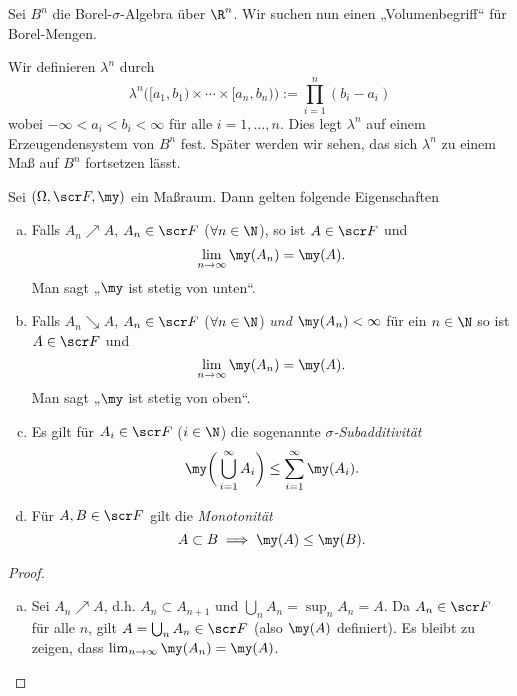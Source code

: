 \begin{ex} \label{1.1.9}
	Sei $B^n$ die Borel-$\sigma$-Algebra über $\R^n$.
	Wir suchen nun einen „Volumenbegriff“ für Borel-Mengen.

	Wir definieren $\lambda^n$ durch
	\[
		\lambda^n \Big( [a_1,b_1) \times \dotsb \times [a_n,b_n) \Big)
		:= \prod_{i=1}^n (b_i-a_i)
	\]
	wobei $-\infty < a_i < b_i < \infty$ für alle $i = 1, \dotsc, n$.
	Dies legt $\lambda^n$ auf einem Erzeugendensystem von $B^n$ fest.
	Später werden wir sehen, das sich $\lambda^n$ zu einem Maß auf $B^n$ fortsetzen lässt.
\end{ex}

\begin{lem} \label{1.1.10}
	Sei $(\Omega, \scr F, \my)$ ein Maßraum.
	Dann gelten folgende Eigenschaften
	\begin{enumerate}[(a)]
		\item
			Falls $A_n \nearrow A$, $A_n \in \scr F$ ($\forall n\in \N$), so ist $A \in \scr F$ und
			\[
				\lim_{n\to \infty} \my (A_n) = \my(A).
			\]
			Man sagt „$\my$ ist stetig von unten“.
		\item
			Falls $A_n \searrow A$, $A_n \in \scr F$ ($\forall n\in \N$) \emph{und} $\my(A_n) < \infty$ für ein $n \in \N$ so ist $A \in \scr F$ und
			\[
				\lim_{n\to \infty} \my(A_n) = \my(A).
			\]
			Man sagt „$\my$ ist stetig von oben“.
		\item
			Es gilt für $A_i \in \scr F$ ($i \in \N$) die sogenannte \emph{$\sigma$-Subadditivität}
			\[
				\my \bigg( \bigcup_{i=1}^\infty A_i \bigg)
				\le \sum_{i=1}^\infty \my (A_i).
			\]
		\item
			Für $A, B \in \scr F$ gilt die \emph{Monotonität}
			\[
				A \subset B
				\implies
				\my(A) \le \my(B).
			\]
	\end{enumerate}
	\begin{proof}
		\begin{enumerate}[(a)]
			\item
				Sei $A_n \nearrow A$, d.h. $A_n \subset A_{n+1}$ und $\bigcup_{n}A_n = \sup_n A_n = A$.
				Da $A_n \in \scr F$ für alle $n$, gilt $A = \bigcup_n A_n \in \scr F$ (also $\my(A)$ definiert).
				Es bleibt zu zeigen, dass $\lim_{n\to \infty} \my(A_n) = \my(A)$.


\end{enumerate}
\end{proof}
\end{lem}
